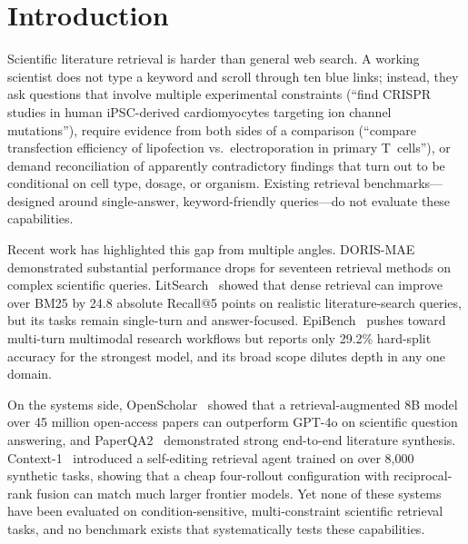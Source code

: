 \documentclass{article}
\begin{document}
\section{Introduction}
\label{sec:intro}

Scientific literature retrieval is harder than general web search. A working scientist does not type a keyword and scroll through ten blue links; instead, they ask questions that involve multiple experimental constraints (``find CRISPR studies in human iPSC-derived cardiomyocytes targeting ion channel mutations''), require evidence from both sides of a comparison (``compare transfection efficiency of lipofection vs.\ electroporation in primary T~cells''), or demand reconciliation of apparently contradictory findings that turn out to be conditional on cell type, dosage, or organism. Existing retrieval benchmarks---designed around single-answer, keyword-friendly queries---do not evaluate these capabilities.

Recent work has highlighted this gap from multiple angles. DORIS-MAE~\cite{dorismae2023} demonstrated substantial performance drops for seventeen retrieval methods on complex scientific queries. LitSearch~\cite{litsearch2024} showed that dense retrieval can improve over BM25 by 24.8 absolute Recall@5 points on realistic literature-search queries, but its tasks remain single-turn and answer-focused. EpiBench~\cite{epibench2026} pushes toward multi-turn multimodal research workflows but reports only 29.2\% hard-split accuracy for the strongest model, and its broad scope dilutes depth in any one domain.

On the systems side, OpenScholar~\cite{openscholar2026} showed that a retrieval-augmented 8B model over 45 million open-access papers can outperform GPT-4o on scientific question answering, and PaperQA2~\cite{skarlinski2024paperqa2} demonstrated strong end-to-end literature synthesis. Context-1~\cite{context2026} introduced a self-editing retrieval agent trained on over 8,000 synthetic tasks, showing that a cheap four-rollout configuration with reciprocal-rank fusion can match much larger frontier models. Yet none of these systems have been evaluated on condition-sensitive, multi-constraint scientific retrieval tasks, and no benchmark exists that systematically tests these capabilities.
\end{document}
